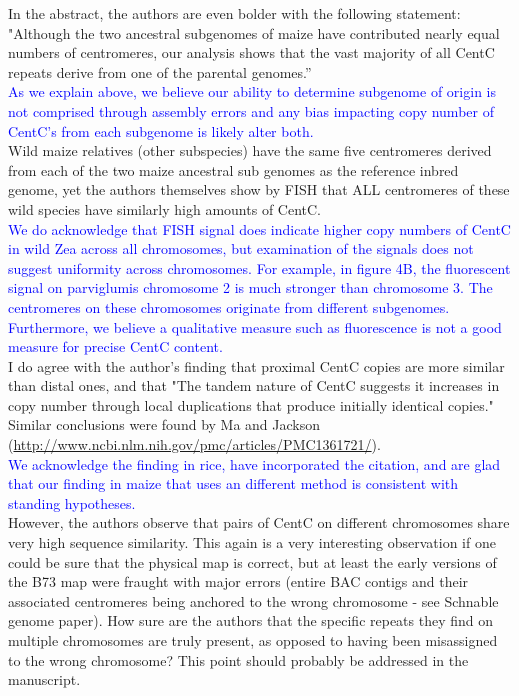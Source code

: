\documentclass[]{article}
\newcommand{\res}[1]{\noindent \textcolor{blue}{{#1}} \\}
\begin{document}
In the abstract, the authors are even bolder with the following statement: "Although the two ancestral subgenomes of maize have contributed nearly equal numbers of centromeres, our analysis shows that the vast majority of all CentC repeats derive from one of the parental genomes.”\\

\res{As we explain above, we believe our ability to determine subgenome of origin is not comprised through assembly errors and any bias impacting copy number of CentC’s from each subgenome is likely alter both.}

Wild maize relatives (other subspecies) have the same five centromeres derived from each of the two maize ancestral sub genomes as the reference inbred genome, yet the authors themselves show by FISH that ALL centromeres of these wild species have similarly high amounts of CentC.\\

\res{We do acknowledge that FISH signal does indicate higher copy numbers of CentC in wild Zea across all chromosomes, but examination of the signals does not suggest uniformity across chromosomes.  For example, in figure 4B, the fluorescent signal on parviglumis chromosome 2 is much stronger than chromosome 3.  The centromeres on these chromosomes originate from different subgenomes.  Furthermore, we believe a qualitative measure such as fluorescence is not a good measure for precise CentC content.}

I do agree with the author's finding that proximal CentC copies are more similar than distal ones, and that "The tandem nature of CentC suggests it increases in copy number through local duplications that produce initially identical copies." Similar conclusions were found by Ma and Jackson (\url{http://www.ncbi.nlm.nih.gov/pmc/articles/PMC1361721/}).\\

\res{We acknowledge the finding in rice, have incorporated the citation, and are glad that our finding in maize that uses an different method is consistent with standing hypotheses.}

However, the authors observe that pairs of  CentC on different chromosomes share very high sequence similarity.  This again is a very interesting observation if one could be sure that the physical map is correct, but at least the early versions of the B73 map were fraught with major errors (entire BAC contigs and their associated centromeres being anchored to the wrong chromosome - see Schnable genome paper).  How sure are the authors that the specific repeats they find on multiple chromosomes are truly present, as opposed to having been misassigned to the wrong chromosome? This point should probably be addressed in the manuscript.\\
\end{document}

